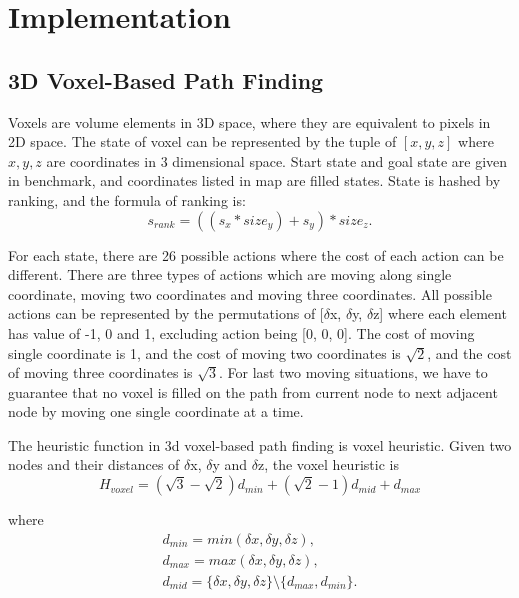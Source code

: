 \documentclass[twocolumn]{article}
\begin{document}
\section{Implementation}

\subsection{3D Voxel-Based Path Finding}

Voxels are volume elements in 3D space, where they are equivalent to pixels in 2D space. The state of voxel can be represented by the tuple of $[x, y, z]$ where $x, y, z$ are coordinates in 3 dimensional space. Start state and goal state are given in benchmark, and coordinates listed in map are filled states.  State is hashed by ranking, and the formula of ranking is: \begin{equation}
    s_{rank} = ((s_x*size_y)+s_y)*size_z.
\end{equation} 

For each state, there are 26 possible actions where the cost of each action can be different. There are three types of actions which are moving along single coordinate, moving two coordinates and moving three coordinates. All possible actions can be represented by the permutations of [$\delta$x, $\delta$y, $\delta$z] where each element has value of -1, 0 and 1,  excluding action being [0, 0, 0]. The cost of moving single coordinate is 1, and the cost of moving two coordinates is $\sqrt{2}$, and the cost of moving three coordinates is $\sqrt{3}$. For last two moving situations, we have to guarantee that no voxel is filled on the path from current node to next adjacent node by moving one single coordinate at a time.

The heuristic function in 3d voxel-based path finding is voxel heuristic. Given two nodes and their distances of $\delta$x, $\delta$y and $\delta$z, the voxel heuristic is
\begin{equation}
H_{voxel} = (\sqrt{3}-\sqrt{2})d_{min} + (\sqrt{2}-1)d_{mid} + d_{max}
\end{equation}

where
\begin{gather*}
    d_{min} = min(\delta x, \delta y, \delta z), \\
    d_{max} = max(\delta x, \delta y, \delta z), \\
    d_{mid} = \{\delta x, \delta y, \delta z\} \setminus \{d_{max}, d_{min}\}.
\end{gather*}
\end{document}
